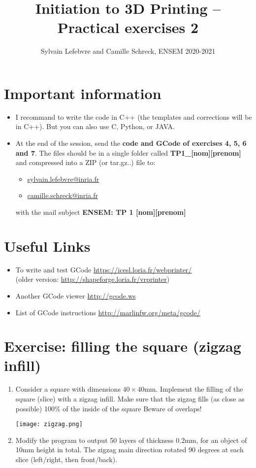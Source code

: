 \documentclass{article}
\date{\displaydate{date}}
\title{Initiation to 3D Printing -- Practical exercises 2}
\author{Sylvain Lefebvre and Camille Schreck, ENSEM 2020-2021}
\begin{document}
\maketitle

\section{Important information}
\begin{itemize}
    \item I recommand to write the code in C++ (the templates and corrections will be in C++). But you can also use C, Python, or JAVA.
    \item At the end of the session, send the {\bfseries code and GCode of exercises 4, 5, 6 and 7}. The files should be in a single folder called {\bfseries TP1\_[nom][prenom]} and compressed into a ZIP (or tar.gz..) file to:
    \begin{itemize}
        \item \href{mailto:sylvain.lefebvre@inria.fr}{sylvain.lefebvre@inria.fr}
        \item \href{mailto:camille.schreck@inria.fr}{camille.schreck@inria.fr}
    \end{itemize}
    with the mail subject {\bfseries ENSEM: TP 1 [nom][prenom]}
\end{itemize}


\section{Useful Links}

\begin{itemize}
	\item To write and test GCode \url{https://icesl.loria.fr/webprinter/}\\ (older version: \url{http://shapeforge.loria.fr/vrprinter})
	\item Another GCode viewer \url{http://gcode.ws}
	\item List of GCode instructions \url{http://marlinfw.org/meta/gcode/}
\end{itemize}

\section{Exercise: filling the square (zigzag infill)}

\begin{enumerate}
    \item Consider a square with dimensions $40 \times 40$mm.
Implement the filling of the square (slice) with a zigzag infill. Make sure that the zigzag fills (as close as possible) 100\% of the inside of the square
Beware of overlaps!

\begin{center}
\texttt{[image: zigzag.png]}
\end{center}

\item Modify the program to output 50 layers of thickness 0.2mm, for an object of 10mm height in total. The zigzag main direction rotated 90 degrees at each slice (left/right, then front/back).
\end{enumerate}
\end{document}
